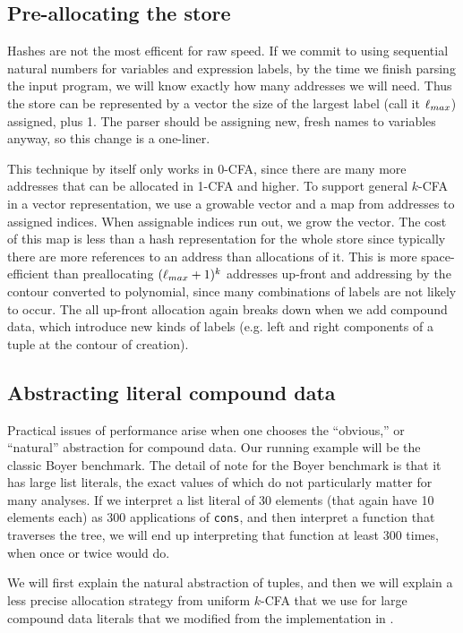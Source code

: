 \documentclass[preprint,onecolumn,9pt]{sigplanconf} %
\begin{document}
\subsection{Pre-allocating the store}
Hashes are not the most efficent for raw speed. If we commit to using
sequential natural numbers for variables and expression labels, by the
time we finish parsing the input program, we will know exactly how
many addresses we will need. Thus the store can be represented by a
vector the size of the largest label (call it ${\ell}_{max}$) assigned, plus
1. The parser should be assigning new, fresh names to variables
anyway, so this change is a one-liner.

This technique by itself only works in 0-CFA, since there are many more
addresses that can be allocated in 1-CFA and higher. To support
general $k$-CFA in a vector representation, we use a growable vector
and a map from addresses to assigned indices. When assignable indices
run out, we grow the vector. The cost of this map is less than a hash
representation for the whole store since typically there are more
references to an address than allocations of it. This is more
space-efficient than preallocating $({\ell}_{max}+1)^k$ addresses
up-front and addressing by the contour converted to polynomial, since
many combinations of labels are not likely to occur. The all up-front
allocation again breaks down when we add compound data, which
introduce new kinds of labels (e.g. left and right components of a
tuple at the contour of creation).

\subsection{Abstracting literal compound data}

Practical issues of performance arise when one chooses the
``obvious,'' or ``natural'' abstraction for compound data. Our running
example will be the classic Boyer benchmark. The detail of note for
the Boyer benchmark is that it has large list literals, the exact
values of which do not particularly matter for many analyses. If we
interpret a list literal of 30 elements (that again have 10 elements
each) as 300 applications of {\tt cons}, and then interpret a function
that traverses the tree, we will end up interpreting that function at
least 300 times, when once or twice would do.

We will first explain the natural abstraction of tuples, and then we
will explain a less precise allocation strategy from uniform $k$-CFA
that we use for large compound data literals that we modified from the
implementation in \citep{dvanhorn:wright-jagannathan-toplas98}.
\end{document}
